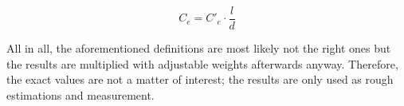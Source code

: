 \begin{equation}
	\label{eq:edge_capacitance}
	C_e = C'_e \cdot \frac{l}{d}
\end{equation}

All in all, the aforementioned definitions are most likely not the right ones but the results are multiplied with adjustable weights afterwards anyway. Therefore, the exact values are not a matter of interest; the results are only used as rough estimations and measurement.





